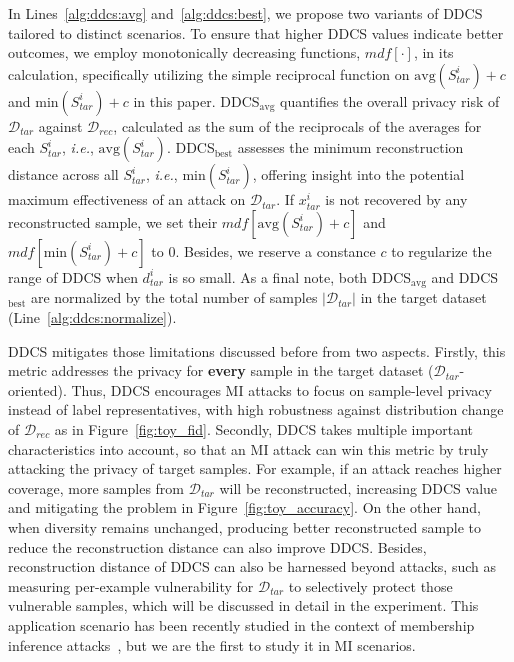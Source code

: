 In Lines~\ref{alg:ddcs:avg} and~\ref{alg:ddcs:best}, we propose two variants of DDCS tailored to distinct scenarios.
To ensure that higher DDCS values indicate better outcomes, we employ monotonically decreasing functions, $mdf[\cdot]$, in its calculation, specifically utilizing the simple reciprocal function on $\text{avg}(S_{tar}^i)+c$ and $\text{min}(S_{tar}^i)+c$ in this paper.
DDCS$_{\text{avg}}$ quantifies the overall privacy risk of $\mathcal{D}_{tar}$ against $\mathcal{D}_{rec}$, calculated as the sum of the reciprocals of the averages for each $S^i_{tar}$, \emph{i.e.}, $\text{avg}(S_{tar}^i)$.
DDCS$_{\text{best}}$ assesses the minimum reconstruction distance across all $S^i_{tar}$, \emph{i.e.}, $\text{min}(S_{tar}^i)$, offering insight into the potential maximum effectiveness of an attack on $\mathcal{D}_{tar}$.
If $x^i_{tar}$ is not recovered by any reconstructed sample, we set their $mdf[\text{avg}(S^i_{tar}) + c]$ and $mdf[\text{min}(S^i_{tar}) + c]$ to 0.
Besides, we reserve a constance $c$ to regularize the range of DDCS when $d^i_{tar}$ is so small.
As a final note, both DDCS$_{\text{avg}}$ and DDCS$_{\text{best}}$ are normalized by the total number of samples $|\mathcal{D}_{tar}|$ in the target dataset (Line~\ref{alg:ddcs:normalize}).

DDCS mitigates those limitations discussed before from two aspects.
Firstly, this metric addresses the privacy for {\bf every} sample in the target dataset ($\mathcal{D}_{tar}$-oriented).
Thus, DDCS encourages MI attacks to focus on sample-level privacy instead of label representatives, with high robustness against distribution change of $\mathcal{D}_{rec}$ as in Figure~\ref{fig:toy_fid}.
Secondly, DDCS takes multiple important characteristics into account, so that an MI attack can win this metric by truly attacking the privacy of target samples.
For example, if an attack reaches higher coverage, more samples from $\mathcal{D}_{tar}$ will be reconstructed, increasing DDCS value and mitigating the problem in Figure~\ref{fig:toy_accuracy}.
On the other hand, when diversity remains unchanged, producing better reconstructed sample to reduce the reconstruction distance can also improve DDCS. Besides, reconstruction distance of DDCS can also be harnessed beyond attacks, such as measuring per-example vulnerability for $\mathcal{D}_{tar}$ to selectively protect those vulnerable samples, which will be discussed in detail in the experiment.
This application scenario  has been recently studied in the context of membership inference attacks~\cite{mif22sp}, but we are the first to study it in MI scenarios.




